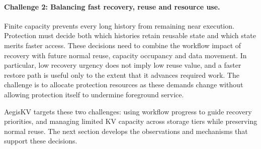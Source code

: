 \paragraph{Challenge 2: Balancing fast recovery, reuse and resource use.}
Finite capacity prevents every long history from remaining near
execution. Protection must decide both which histories retain reusable
state and which state merits faster access. These decisions
need to combine the workflow impact of recovery with future normal reuse,
capacity occupancy and data movement. In particular, low recovery
urgency does not imply low reuse value, and a faster restore path is
useful only to the extent that it advances required work. The challenge
is to allocate protection resources as these demands change without
allowing protection itself to undermine foreground service.

\label{sec:motivation-goals}
AegisKV targets these two challenges: using workflow progress to guide
recovery priorities, and managing limited KV capacity across storage
tiers while preserving normal reuse. The next section develops the
observations and mechanisms that support these decisions.
